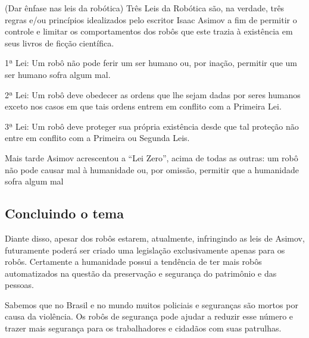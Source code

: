 \documentclass[12pt,a4paper]{article}
\begin{document}
    (Dar ênfase nas leis da robótica)
    Três Leis da Robótica são, na verdade, três regras e/ou princípios idealizados pelo escritor Isaac Asimov a fim de permitir o controle e limitar os comportamentos dos robôs que este trazia à existência em seus livros de ficção científica.

    1ª Lei: Um robô não pode ferir um ser humano ou, por inação, permitir que um ser humano sofra algum mal.

    2ª Lei: Um robô deve obedecer as ordens que lhe sejam dadas por seres humanos exceto nos casos em que tais ordens entrem em conflito com a Primeira Lei.

    3ª Lei: Um robô deve proteger sua própria existência desde que tal proteção não entre em conflito com a Primeira ou Segunda Leis.

    Mais tarde Asimov acrescentou a “Lei Zero”, acima de todas as outras: um robô não pode causar mal à humanidade ou, por omissão, permitir que a humanidade sofra algum mal

    \subsection{Concluindo o tema}
    Diante disso, apesar dos robôs estarem, atualmente, infringindo as leis de Asimov, futuramente poderá ser criado uma legislação exclusivamente apenas para os robôs. Certamente a humanidade possui a tendência de ter mais robôs automatizados na questão da preservação e segurança do patrimônio e das pessoas.

    Sabemos que no Brasil e no mundo muitos policiais e seguranças são mortos por causa da violência. Os robôs de segurança pode ajudar a reduzir esse número e trazer mais segurança para os trabalhadores e cidadãos com suas patrulhas.  
\end{document}
